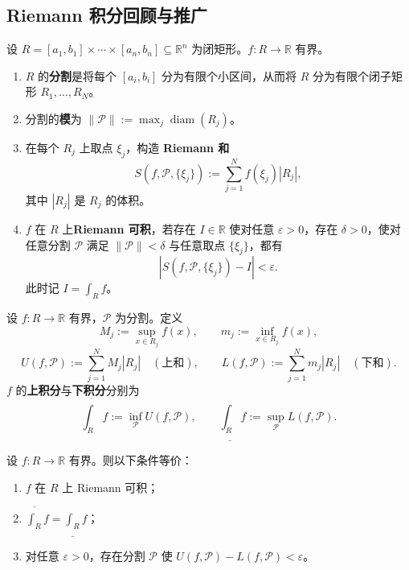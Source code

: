 \subsection{Riemann 积分回顾与推广}

\begin{definition}\label{def:riemann_integral_rectangle}
设 $R = [a_1, b_1] \times \cdots \times [a_n, b_n] \subseteq \mathbb{R}^n$ 为闭矩形。$f: R \to \mathbb{R}$ 有界。
\begin{enumerate}[label=(\roman*)]
    \item $R$ 的\textbf{分割}是将每个 $[a_i, b_i]$ 分为有限个小区间，从而将 $R$ 分为有限个闭子矩形 $R_1, \dots, R_N$。
    \item 分割的\textbf{模}为 $\|\mathcal{P}\| := \max_j \operatorname{diam}(R_j)$。
    \item 在每个 $R_j$ 上取点 $\xi_j$，构造 \textbf{Riemann 和}
    \[
    S(f, \mathcal{P}, \{\xi_j\}) := \sum_{j=1}^{N} f(\xi_j) |R_j|,
    \]
    其中 $|R_j|$ 是 $R_j$ 的体积。
    \item $f$ 在 $R$ 上\textbf{Riemann 可积}，若存在 $I \in \mathbb{R}$ 使对任意 $\varepsilon > 0$，存在 $\delta > 0$，使对任意分割 $\mathcal{P}$ 满足 $\|\mathcal{P}\| < \delta$ 与任意取点 $\{\xi_j\}$，都有
    \[
    |S(f, \mathcal{P}, \{\xi_j\}) - I| < \varepsilon.
    \]
    此时记 $I = \int_R f$。
\end{enumerate}
\end{definition}

\begin{definition}\label{def:darboux_sums}
设 $f: R \to \mathbb{R}$ 有界，$\mathcal{P}$ 为分割。定义
\[
M_j := \sup_{x \in R_j} f(x), \qquad m_j := \inf_{x \in R_j} f(x),
\]
\[
U(f, \mathcal{P}) := \sum_{j=1}^{N} M_j |R_j| \quad (\text{上和}), \qquad
L(f, \mathcal{P}) := \sum_{j=1}^{N} m_j |R_j| \quad (\text{下和}).
\]
$f$ 的\textbf{上积分}与\textbf{下积分}分别为
\[
\overline{\int_R} f := \inf_{\mathcal{P}} U(f, \mathcal{P}), \qquad
\underline{\int_R} f := \sup_{\mathcal{P}} L(f, \mathcal{P}).
\]
\end{definition}

\begin{theorem}\label{thm:riemann_integrable_criterion}
设 $f: R \to \mathbb{R}$ 有界。则以下条件等价：
\begin{enumerate}[label=(\roman*)]
    \item $f$ 在 $R$ 上 Riemann 可积；
    \item $\overline{\int_R} f = \underline{\int_R} f$；
    \item 对任意 $\varepsilon > 0$，存在分割 $\mathcal{P}$ 使 $U(f, \mathcal{P}) - L(f, \mathcal{P}) < \varepsilon$。
\end{enumerate}
\end{theorem}

